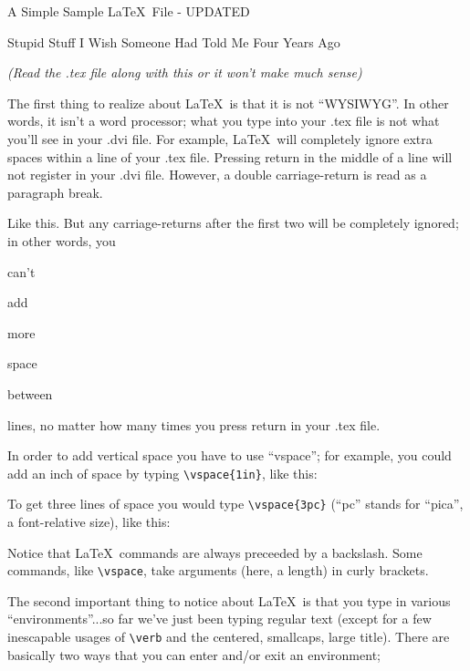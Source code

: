 \documentclass{article}
\begin{document}
\centerline{\sc \large A Simple Sample \LaTeX\ File - UPDATED}
\vspace{.5pc}
\centerline{\sc Stupid Stuff I Wish Someone Had Told Me Four Years Ago}
\centerline{\it (Read the .tex file along with this or it won't 
            make much sense)}
\vspace{2pc}

The first thing to realize about \LaTeX\ is that it is not ``WYSIWYG''. 
In other words, it isn't a word processor; what you type into your 
.tex file is not what you'll see in your .dvi file.  For example, 
\LaTeX\ will      completely     ignore               extra
spaces    within                             a line of your .tex file.
Pressing return
in 
the 
middle 
of
a
line
will not register in your .dvi file. However, a double carriage-return
is read as a paragraph break.

Like this.  But any carriage-returns after the first two will be 
completely ignored; in other words, you 


can't 

add






more 




space 


between 




lines, no matter how many times you press return in your .tex file.

In order to add vertical space you have to use ``vspace''; for example, 
you could add an inch of space by typing \verb|\vspace{1in}|, like this:
\vspace{1in}

To get three lines of space you would type \verb|\vspace{3pc}|
(``pc'' stands for ``pica'', a font-relative size), like this:
\vspace{3pc}

Notice that \LaTeX\ commands are always preceeded by a backslash.  
Some commands, like \verb|\vspace|, take arguments (here, a length) in
curly brackets.  

The second important thing to notice about \LaTeX\ is that you type 
in various ``environments''...so far we've just been typing regular 
text (except for a few inescapable usages of \verb|\verb| and the
centered, smallcaps, large title).  There are basically two ways that 
you can enter and/or exit an environment;
\vspace{1pc}
\end{document}
